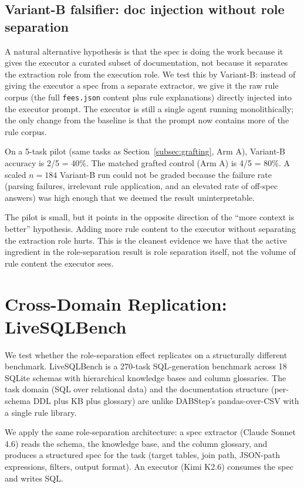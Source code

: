 \documentclass[conference]{IEEEtran}
\newcommand{\Kimi}{Kimi K2.6}
\newcommand{\Sonnet}{Claude Sonnet 4.6}
\begin{document}
\subsection{Variant-B falsifier: doc injection without role separation}
\label{subsec:variant_b}

A natural alternative hypothesis is that the spec is doing the work because it gives the executor a curated subset of documentation, not because it separates the extraction role from the execution role. We test this by Variant-B: instead of giving the executor a spec from a separate extractor, we give it the raw rule corpus (the full \texttt{fees.json} content plus rule explanations) directly injected into the executor prompt. The executor is still a single agent running monolithically; the only change from the baseline is that the prompt now contains more of the rule corpus.

On a 5-task pilot (same tasks as Section~\ref{subsec:grafting}, Arm A), Variant-B accuracy is 2/5 = 40\%. The matched grafted control (Arm A) is 4/5 = 80\%. A scaled $n=184$ Variant-B run could not be graded because the failure rate (parsing failures, irrelevant rule application, and an elevated rate of off-spec answers) was high enough that we deemed the result uninterpretable.

The pilot is small, but it points in the opposite direction of the ``more context is better'' hypothesis. Adding more rule content to the executor without separating the extraction role hurts. This is the cleanest evidence we have that the active ingredient in the role-separation result is role separation itself, not the volume of rule content the executor sees.

\section{Cross-Domain Replication: LiveSQLBench}
\label{sec:cross_domain}

We test whether the role-separation effect replicates on a structurally different benchmark. LiveSQLBench is a 270-task SQL-generation benchmark across 18 SQLite schemas with hierarchical knowledge bases and column glossaries. The task domain (SQL over relational data) and the documentation structure (per-schema DDL plus KB plus glossary) are unlike DABStep's pandas-over-CSV with a single rule library.

We apply the same role-separation architecture: a spec extractor (\Sonnet{}) reads the schema, the knowledge base, and the column glossary, and produces a structured spec for the task (target tables, join path, JSON-path expressions, filters, output format). An executor (\Kimi{}) consumes the spec and writes SQL.
\end{document}
